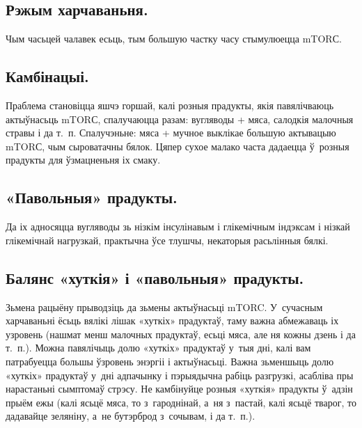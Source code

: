 \subsection{Рэжым харчаваньня.}
Чым часьцей чалавек есьць, тым большую частку часу стымулюецца mTORС.

\subsection{Камбінацыі.}
Праблема становіцца яшчэ горшай, калі розныя прадукты, якія павялічваюць актыўнасьць mTORС, спалучаюцца разам: вугляводы + мяса, салодкія малочныя стравы і да т.~п. Спалучэньне: мяса + мучное выклікае большую актывацыю mTORС, чым сыроватачны бялок. Цяпер сухое малако часта дадаецца ў~розныя прадукты для ўзмацненьня іх смаку.

\subsection{«Павольныя» прадукты.}
Да іх адносяцца вугляводы зь нізкім інсулінавым і глікемічным індэксам і нізкай глікемічнай нагрузкай, практычна ўсе тлушчы, некаторыя расьлінныя бялкі.

\subsection{Балянс «хуткія» і «павольныя» прадукты.}
Зьмена рацыёну прыводзіць да зьмены актыўнасьці mTORC. У~сучасным харчаваньні ёсьць вялікі лішак «хуткіх» прадуктаў, таму важна абмежаваць іх узровень (нашмат менш малочных прадуктаў, есьці мяса, але ня кожны дзень і да т.~п.). Можна павялічыць долю «хуткіх» прадуктаў у~тыя дні, калі вам патрабуецца большы ўзровень энэргіі і актыўнасьці. Важна зьменшыць долю «хуткіх» прадуктаў у~дні адпачынку і пэрыядычна рабіць разгрузкі, асабліва пры нарастаньні сымптомаў стрэсу. Не камбінуйце розныя «хуткія» прадукты ў~адзін прыём ежы (калі ясьцё мяса, то з~гароднінай, а~ня з~пастай, калі ясьцё тварог, то дадавайце зеляніну, а~не бутэрброд з~сочывам, і да т.~п.).


